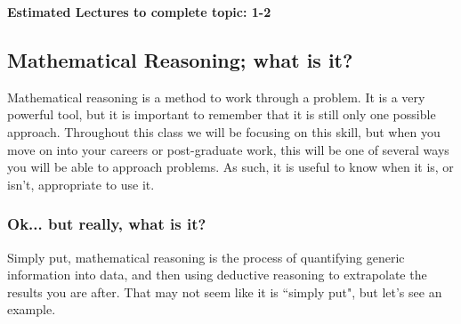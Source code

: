 
\ifcompletedNotes
{}
\textbf{Estimated Lectures to complete topic: 1-2}
\fi

\subsection{Mathematical Reasoning; what is it?}
Mathematical reasoning is a method to work through a problem. It is a very powerful tool, but it is important to remember that it is still only one possible approach. Throughout this class we will be focusing on this skill, but when you move on into your careers or post-graduate work, this will be one of several ways you will be able to approach problems. As such, it is useful to know when it is, or isn't, appropriate to use it.

\subsubsection*{Ok... but really, what is it?}
Simply put, mathematical reasoning is the process of quantifying generic information into data, and then using deductive reasoning to extrapolate the results you are after. That may not seem like it is ``simply put", but let's see an example.


